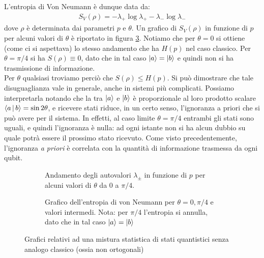 \documentclass[../../InformazioneQuantistica.tex]{subfiles}
\begin{document}
L'entropia di Von Neumann è dunque data da:
\begin{align*}
    S_V(\rho) = -\lambda_+ \log \lambda_+ - \lambda_- \log \lambda_-
\end{align*}
dove $\rho$ è determinata dai parametri $p$ e $\theta$. Un grafico di $S_V(\rho)$ in funzione di $p$ per alcuni valori di $\theta$ è riportato in figura \ref{fig:entropia-von-neumann}. Notiamo che per $\theta=0$ si ottiene (come ci si aspettava) lo stesso andamento che ha $H(p)$ nel caso classico. Per $\theta=\pi/4$ si ha $S(\rho) \equiv 0$, dato che in tal caso $\Ket{a} = \Ket{b}$ e quindi non si ha trasmissione di informazione.\\
Per $\theta$ qualsiasi troviamo perciò che $S(\rho) \leq H(p)$. Si può dimostrare che tale disuguaglianza vale in generale, anche in sistemi più complicati. Possiamo interpretarla notando che la  tra $\Ket{a}$ e $\Ket{b}$ è proporzionale al loro prodotto scalare $\Braket{a|b} = \sin 2\theta$, e ricevere stati  riduce, in un certo senso, l'ignoranza a priori che si può avere per il sistema. In effetti, al caso limite $\theta=\pi/4$ entrambi gli stati sono uguali, e quindi l'ignoranza è nulla: ad ogni istante non si ha alcun dubbio su quale potrà essere il prossimo stato ricevuto. Come visto precedentemente, l'ignoranza \textit{a priori} è correlata con la quantità di informazione trasmessa da ogni qubit.

\begin{figure}[H]
\centering
\begin{subfigure}[t]{0.45\textwidth}
\centering

\caption{\footnotesize Andamento degli autovalori $\lambda_\pm$ in funzione di $p$ per alcuni valori di $\theta$ da $0$ a $\pi/4$.\label{fig:andamenti-autoval}}
\end{subfigure}%
\begin{subfigure}[t]{0.45\textwidth}
\centering

\caption{\footnotesize Grafico dell'entropia di von Neumann per $\theta=0,\pi/4$ e valori intermedi. Nota: per $\pi/4$ l'entropia si annulla, dato che in tal caso $\Ket{a}=\Ket{b}$ \label{fig:entropia-von-neumann}}
\end{subfigure}%
\caption{Grafici relativi ad una mistura statistica di stati quantistici senza analogo classico (ossia non ortogonali)}
\end{figure}
\end{document}
